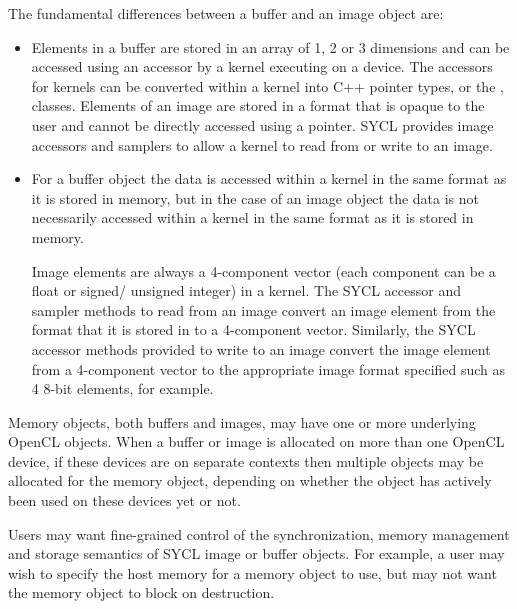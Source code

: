 The fundamental differences between a buffer and an image object are:
\begin{itemize}
    \item
        Elements in a buffer are stored in an array of 1, 2 or 3
        dimensions and can be accessed using an accessor by a kernel
        executing on a device. The accessors for kernels can be
        converted within a kernel into C++ pointer types, or
        the ,
         classes.
        Elements of an image are
        stored in a format that is opaque to the user and cannot be
        directly accessed using a pointer.  SYCL provides image
        accessors and samplers to allow a kernel to read from or write
        to an image.

      \item For a buffer object the data is accessed within a kernel
        in the same format as it is stored in memory, but in the case
        of an image object the data is not necessarily accessed within
        a kernel in the same format as it is stored in memory.

        Image elements are always a
          4-component vector (each component can be a float or signed/
  unsigned integer) in a kernel.  The SYCL accessor and
        sampler methods to read from an image convert an image element from
          the format that it is stored in to a 4-component vector.  Similarly, the
          SYCL accessor methods provided to write to an image convert the image
          element from a 4-component vector to the appropriate image format
          specified such as 4 8-bit elements, for
        example.  
\end{itemize}

Memory objects, both buffers and images, may have one or more underlying OpenCL
 objects. When a buffer or image is allocated on more than
one OpenCL device, if these devices are on separate contexts then multiple
 objects may be allocated for the memory object, depending on
whether the object has actively been used on these devices yet or not.


Users may want fine-grained control of the synchronization, memory management
and storage semantics of SYCL image or buffer objects. For example, a user may
wish to specify the host memory for a memory object to use, but may not want the
memory object to block on destruction.

